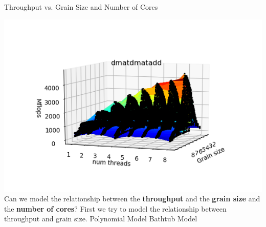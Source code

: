 \documentclass[10pt]{beamer}
\begin{document}
\begin{frame}{Throughput vs. Grain Size and Number of Cores}
	\begin{outline}
		\includegraphics[scale=0.2]{images/fig1.png}	\\
		Can we model the relationship between the \textbf{throughput} and the \textbf{grain size} and the \textbf{number of cores}?
		\pause	
		\1First we try to model the relationship between throughput and grain size.
		\pause	
		\2Polynomial Model
		\2Bathtub Model
	\end{outline}
\end{frame}

\end{document}
